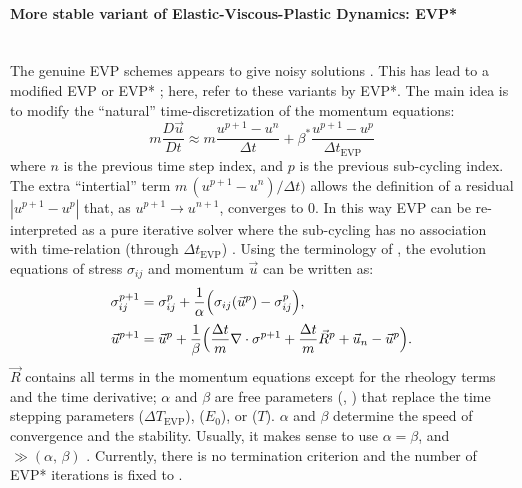 \paragraph{More stable variant of Elastic-Viscous-Plastic Dynamics:  EVP*\label{sec:pkg:seaice:EVPstar}}~\\ 
%
The genuine EVP schemes appears to give noisy solutions \citep{hun01,
  lemieux12, bouillon13}. This has lead to a modified EVP or EVP*
\citep{lemieux12, bouillon13, kimmritz15}; here, refer to these
variants by EVP*. The main idea is to modify the ``natural''
time-discretization of the momentum equations:
\begin{equation}
  \label{eq:evpstar}
  m\frac{D\vec{u}}{Dt} \approx m\frac{u^{p+1}-u^{n}}{\Delta{t}}
  + \beta^{*}\frac{u^{p+1}-u^{p}}{\Delta{t}_{\mathrm{EVP}}}
\end{equation}
where $n$ is the previous time step index, and $p$ is the previous
sub-cycling index. The extra ``intertial'' term
$m\,(u^{p+1}-u^{n})/\Delta{t})$ allows the definition of a residual
$|u^{p+1}-u^{p}|$ that, as $u^{p+1} \rightarrow u^{n+1}$, converges to
$0$. In this way EVP can be re-interpreted as a pure iterative solver
where the sub-cycling has no association with time-relation (through
$\Delta{t}_{\mathrm{EVP}}$) \citep{bouillon13, kimmritz15}. Using the
terminology of \citet{kimmritz15}, the evolution equations of stress
$\sigma_{ij}$ and momentum $\vec{u}$ can be written as:
\begin{align}
  \label{eq:evpstarsigma}
  \sigma_{ij}^{p+1}&=\sigma_{ij}^p+\frac{1}{\alpha}
  \Big(\sigma_{ij}(\vec{u}^p)-\sigma_{ij}^p\Big),
  \phantom{\int}\\
  \label{eq:evpstarmom}
  \vec{u}^{p+1}&=\vec{u}^p+\frac{1}{\beta}
  \Big(\frac{\Delta t}{m}\nabla \cdot{\bf \sigma}^{p+1}+
  \frac{\Delta t}{m}\vec{R}^{p}+\vec{u}_n-\vec{u}^p\Big).
\end{align}
$\vec{R}$ contains all terms in the momentum equations except for the
rheology terms and the time derivative; $\alpha$ and $\beta$ are free
parameters (, ) that
replace the time stepping parameters 
($\Delta{T}_{\mathrm{EVP}}$),  ($E_{0}$), or
 ($T$). $\alpha$ and $\beta$ determine the
speed of convergence and the stability. Usually, it makes sense to use
$\alpha = \beta$, and  $\gg
(\alpha,\,\beta)$ \citep{kimmritz15}. Currently, there is no
termination criterion and the number of EVP* iterations is fixed to
.

